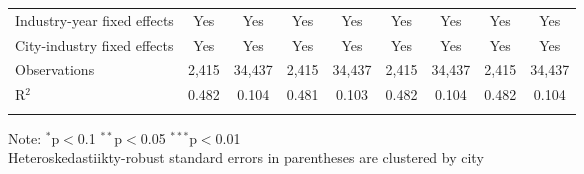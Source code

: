 \documentclass[12pt]{article}
\begin{document}
\begin{table}[!htbp]
\begin{adjustbox}{width=\textwidth, totalheight=\baselineskip,keepaspectratio}
\begin{tabular}{@{\extracolsep{5pt}}lcccccccc}
      Industry-year fixed effects                             & Yes          & Yes           & Yes           & Yes           & Yes           & Yes           & Yes           & Yes           \\
      City-industry fixed effects                             & Yes          & Yes           & Yes           & Yes           & Yes           & Yes           & Yes           & Yes           \\
      Observations                                            & 2,415        & 34,437        & 2,415         & 34,437        & 2,415         & 34,437        & 2,415         & 34,437        \\
      R$^{2}$                                                 & 0.482        & 0.104         & 0.481         & 0.103         & 0.482         & 0.104         & 0.482         & 0.104         \\
      \hline
      \hline \\[-1.8ex]
      \end{tabular}
  \end{adjustbox}
  \begin{tablenotes}
      \small
      \item 
      Note: $^{*}$p$<$0.1 $^{**}$p$<$0.05 $^{***}$p$<$0.01 \\
      Heteroskedastiikty-robust standard errors in parentheses are clustered by city \\
    \end{tablenotes}
\end{table}
\end{document}
